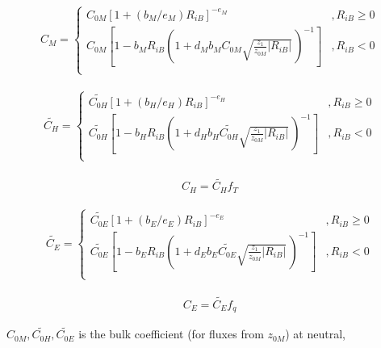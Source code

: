 \begin{eqnarray}
C_M = \left\{
      \begin{array}{lr}
      C_{0M} [ 1 + (b_M/e_M)  R_{iB} ]^{-e_M}
            &,
          R_{iB} \geq 0 \\
      C_{0M} \left[ 1 - b_M R_{iB} \left( 1+ d_M b_M C_{0M}
                                  \sqrt{\frac{z_1}{z_{0M}}| R_{iB}|} \,
                                  \right)^{-1} \right]
          &,
          R_{iB} < 0 \\
      \end{array} \right.
\end{eqnarray}

\begin{eqnarray}
\widetilde{C_H} = \left\{
      \begin{array}{lr}
      \widetilde{C_{0H}} [ 1 + (b_H/e_H) R_{iB} ]^{-e_H}
            &,
          R_{iB} \geq 0 \\
      \widetilde{C_{0H}} \left[ 1 - b_H R_{iB}
                                  \left( 1+ d_H b_H \widetilde{C_{0H}}
                                  \sqrt{\frac{z_1}{z_{0M}}| R_{iB}|} \,
                                  \right)^{-1} \right]
             &,
          R_{iB} < 0 \\
      \end{array} \right.
\end{eqnarray}

\begin{eqnarray}
C_H = \widetilde{C_H} f_T
\end{eqnarray}

\begin{eqnarray}
\widetilde{C_E} = \left\{
      \begin{array}{lr}
      \widetilde{C_{0E}} [ 1 + (b_E/e_E) R_{iB} ]^{-e_E}
            &,
          R_{iB} \geq 0 \\
      \widetilde{C_{0E}} \left[ 1 - b_E R_{iB}
                                  \left( 1+ d_E b_E \widetilde{C_{0E}}
                                  \sqrt{\frac{z_1}{z_{0M}}| R_{iB}|} \,
                                  \right)^{-1} \right]
          &,
          R_{iB} < 0 \\
      \end{array} \right.
\end{eqnarray}

\begin{eqnarray}
C_E = \widetilde{C_E} f_q
\end{eqnarray}

\(C_{0M}, \widetilde{C_{0H}}, \widetilde{C_{0E}}\) is the bulk
coefficient (for fluxes from \(z_{0M}\)) at neutral,

